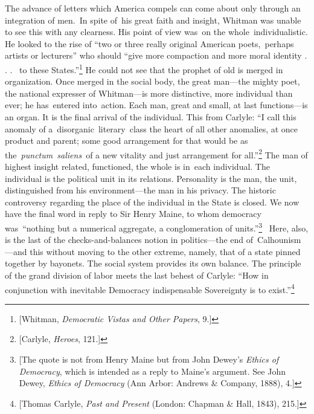 \documentclass[twoside,symmetric,nobib,justified]{tufte-book}
\begin{document}
The advance of letters which America compels can come about only through
an integration of men.~In spite of~his great faith and insight, Whitman
was unable to see this with any clearness. His point of view was~on the
whole~individualistic. He looked to the rise of ``two or three really
original American poets,~perhaps artists or lecturers'' who should
``give more compaction and more moral identity . . .~ to these
States.''\footnote{{[}Whitman, \emph{Democratic Vistas and Other
  Papers}, 9.{]}} He could not see that the prophet of old is merged in
organization. Once merged in the social body, the great man---the mighty
poet, the national expresser of Whitman---is more distinctive, more
individual than ever; he has~entered into~action. Each man, great and
small, at last functions---is an organ. It is the final arrival of the
individual. This from Carlyle: ``I call this anomaly of
a~disorganic~literary~class the heart of all other anomalies, at once
product and parent; some good arrangement for that would be as
the\emph{~punctum~saliens}~of a new vitality and just arrangement for
all.''\footnote{{[}Carlyle, \emph{Heroes}, 121.{]}} The man of highest
insight related, functioned, the whole is in~each individual. The
individual is the political unit in its relations. Personality is the
man, the unit, distinguished from his environment---the man in his
privacy. The historic controversy regarding the place of the individual
in the State is closed. We now have the final word in reply to Sir Henry
Maine, to whom democracy was~``nothing but a numerical aggregate, a
conglomeration of units.''\footnote{{[}The quote is not from Henry Maine
  but from John Dewey's \emph{Ethics of Democracy}, which \emph{} is
  intended as a reply to Maine's argument. See John Dewey, \emph{Ethics
  of Democracy} (Ann Arbor: Andrews \& Company, 1888), 4.{]}}~ Here,
also, is the last of the checks-and-balances notion in politics---the
end of~Calhounism---and this without moving to the other extreme,
namely, that of a state pinned together by bayonets. The social system
provides its own balance. The principle of the grand division of labor
meets the last behest of Carlyle: ``How in conjunction with inevitable
Democracy indispensable Sovereignty is to exist.''\footnote{{[}Thomas
  Carlyle, \emph{Past and Present} (London: Chapman \& Hall, 1843),
  215.{]}}~
\end{document}
